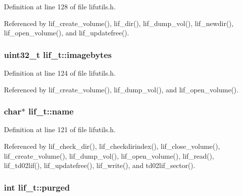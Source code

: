 Definition at line 128 of file lifutils.\+h.



Referenced by lif\+\_\+create\+\_\+volume(), lif\+\_\+dir(), lif\+\_\+dump\+\_\+vol(), lif\+\_\+newdir(), lif\+\_\+open\+\_\+volume(), and lif\+\_\+updatefree().

\subsubsection[{\texorpdfstring{imagebytes}{imagebytes}}]{\setlength{\rightskip}{0pt plus 5cm}uint32\+\_\+t lif\+\_\+t\+::imagebytes}\hypertarget{structlif__t_afabd64e66adb03eef2249b6c627faac7}{}\label{structlif__t_afabd64e66adb03eef2249b6c627faac7}


Definition at line 124 of file lifutils.\+h.



Referenced by lif\+\_\+create\+\_\+volume(), lif\+\_\+dump\+\_\+vol(), and lif\+\_\+open\+\_\+volume().

\subsubsection[{\texorpdfstring{name}{name}}]{\setlength{\rightskip}{0pt plus 5cm}char$\ast$ lif\+\_\+t\+::name}\hypertarget{structlif__t_ae6b943f3c26005fc375169960e9049f7}{}\label{structlif__t_ae6b943f3c26005fc375169960e9049f7}


Definition at line 121 of file lifutils.\+h.



Referenced by lif\+\_\+check\+\_\+dir(), lif\+\_\+checkdirindex(), lif\+\_\+close\+\_\+volume(), lif\+\_\+create\+\_\+volume(), lif\+\_\+dump\+\_\+vol(), lif\+\_\+open\+\_\+volume(), lif\+\_\+read(), lif\+\_\+td02lif(), lif\+\_\+updatefree(), lif\+\_\+write(), and td02lif\+\_\+sector().

\subsubsection[{\texorpdfstring{purged}{purged}}]{\setlength{\rightskip}{0pt plus 5cm}int lif\+\_\+t\+::purged}\hypertarget{structlif__t_a1dfef3ca99d6ba9680bb9b6bf8fafc32}{}\label{structlif__t_a1dfef3ca99d6ba9680bb9b6bf8fafc32}


